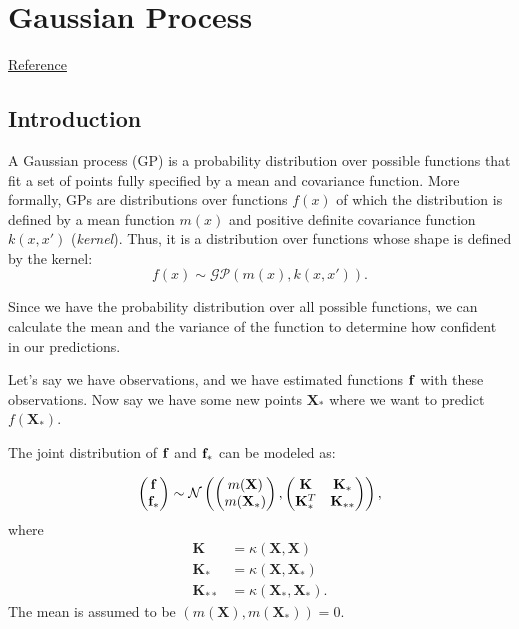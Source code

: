 \chapter{Gaussian Process}
\href{https://github.com/jwangjie/Gaussian-Process-Regression-Tutorial}{Reference}


\section{Introduction}
\label{sec:gaussian_process}
A Gaussian process (GP) is a probability distribution over possible functions that fit a set of points fully specified by a mean and covariance function. More formally, GPs are distributions over functions $f(x)$ of which the distribution is defined by a mean function $m(x)$ and positive definite covariance function $k(x,x')$ (\ie \textit{kernel}). Thus, it is a distribution over functions whose shape is defined by the kernel:
$$f(x) \sim \mathcal{GP}(m(x),k(x,x')).$$

Since we have the probability distribution over all possible functions, we can calculate the mean and the variance of the function to determine how confident in our predictions.

Let's say we have observations, and we have estimated functions ${\mathbf{f}}$ with these observations. Now say we have some new points $\mathbf{X}_*$ where we want to predict $f(\mathbf{X}_*)$.

The joint distribution of ${\mathbf{f}}$ and ${\mathbf{f}}_*$ can be modeled as:

\begin{align*}
	\begin{pmatrix}
		{\mathbf{f}}\\
		{\mathbf{f}}_*
		\end{pmatrix}\sim \mathcal{N} 
		\begin{pmatrix}
		\begin{pmatrix}
			m(\mathbf{X})\\
			m(\mathbf{X}_*)
		\end{pmatrix},
		\begin{pmatrix}
			\mathbf{K} & \mathbf{K}_*\\
			\mathbf{K}_*^T & \mathbf{K}_{**}
		\end{pmatrix}
		\end{pmatrix},
\end{align*}
where 
\begin{align*}
	\mathbf{K }&= \kappa(\mathbf{X,X})\\
	\mathbf{K}_* &= \kappa(\mathbf{X},\mathbf{X}_*)\\
	\mathbf{K}_{**} &= \kappa(\mathbf{X}_*,\mathbf{X}_*).
\end{align*}
The mean is assumed to be $(m(\mathbf{X}), m(\mathbf{X}_*))=0$. 

